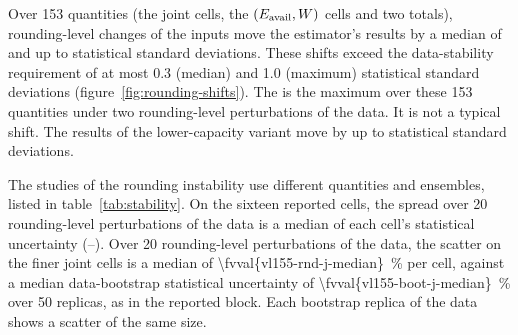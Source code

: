Over 153 quantities (the joint cells, the $(E_{\mathrm{avail}},W)$ cells and two totals), rounding-level changes of the inputs move the estimator's results by a median of  and up to  statistical standard deviations. These shifts exceed the data-stability requirement of at most 0.3 (median) and 1.0 (maximum) statistical standard deviations (figure~\ref{fig:rounding-shifts}). The  is the maximum over these 153 quantities under two rounding-level perturbations of the data. It is not a typical shift. The results of the lower-capacity variant move by up to  statistical standard deviations.

The studies of the rounding instability use different quantities and ensembles, listed in table~\ref{tab:stability}. On the sixteen reported cells, the spread over 20 rounding-level perturbations of the data is a median  of each cell's statistical uncertainty (--). Over 20 rounding-level perturbations of the data, the scatter on the finer joint cells is a median of \SI{\fvval{vl155-rnd-j-median}}{\percent} per cell, against a median data-bootstrap statistical uncertainty of \SI{\fvval{vl155-boot-j-median}}{\percent} over 50 replicas, as in the reported block. Each bootstrap replica of the data shows a scatter of the same size.

